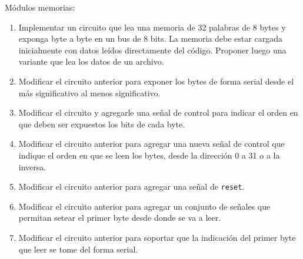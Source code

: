 \documentclass[a4paper,11pt]{article}
\begin{document}
\begin{exercise}%
\noindent Módulos memorias:
\begin{enumerate}
\item Implementar un circuito que lea una memoria de 32 palabras de 8 bytes y exponga byte a byte en un bus de 8 bits. La memoria debe estar cargada inicialmente con datos leídos directamente del código. Proponer luego una variante que lea los datos de un archivo.
\item Modificar el circuito anterior para exponer los bytes de forma serial desde el más significativo al menos significativo.
\item Modificar el circuito y agregarle una señal de control para indicar el orden en que deben ser expuestos los bits de cada byte.
\item Modificar el circuito anterior para agregar una nueva señal de control que indique el orden en que se leen los bytes, desde la dirección 0 a 31 o a la inversa.
\item Modificar el circuito anterior para agregar una señal de \texttt{reset}.
\item Modificar el circuito anterior para agregar un conjunto de señales que permitan setear el primer byte desde donde se va a leer.
\item Modificar el circuito anterior para soportar que la indicación del primer byte que leer se tome del forma serial.
\end{enumerate}
\end{exercise}
\end{document}
